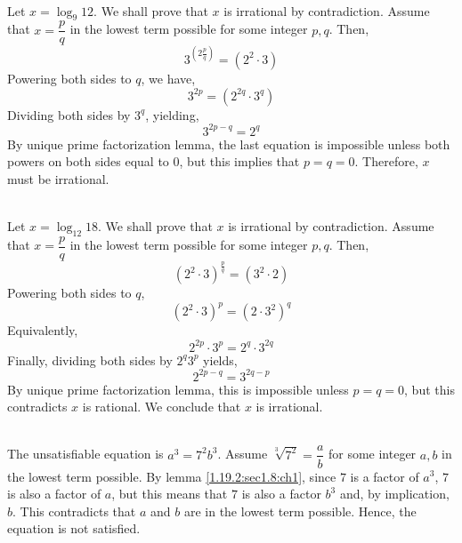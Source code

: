 \begin{pr}\leavevmode
    \\
    Let $x = \log_9 12$. We shall prove that $x$ is irrational by contradiction.
    Assume that $x = \dfrac{p}{q}$ in the lowest term possible for some integer $p,q$. Then,
    \begin{equation*}
        3^{\left(2\frac{p}{q}\right)} = (2^2 \cdot 3)
    \end{equation*}
    Powering both sides to $q$, we have,
    \begin{equation*}
        3^{2p} = (2^{2q} \cdot 3^q)
    \end{equation*}
    Dividing both sides by $3^q$, yielding,
    \begin{equation*}
        3^{2p - q} = 2^q
    \end{equation*}
    By unique prime factorization lemma, the last equation is impossible unless
    both powers on both sides equal to $0$, but this implies that $p = q = 0$. Therefore,
    $x$ must be irrational.
\end{pr}

\begin{pr}\leavevmode
    \\
    Let $x = \log_{12} 18$. We shall prove that $x$ is irrational by contradiction.
    Assume that $x = \dfrac{p}{q}$ in the lowest term possible for some integer $p,q$.
    Then,
    \begin{equation*}
        (2^2 \cdot 3)^{\frac{p}{q}} = (3^2 \cdot 2)
    \end{equation*}
    Powering both sides to $q$,
    \begin{equation*}
        (2^2 \cdot 3)^p = (2 \cdot 3^2)^q
    \end{equation*}
    Equivalently,
    \begin{equation*}
        2^{2p} \cdot 3^p = 2^q \cdot 3^{2q}
    \end{equation*}
    Finally, dividing both sides by $2^q3^p$ yields,
    \begin{equation*}
        2^{2p - q} = 3^{2q - p}
    \end{equation*}
    By unique prime factorization lemma, this is impossible unless $p = q = 0$, but
    this contradicts $x$ is rational. We conclude that $x$ is irrational.
\end{pr}

\begin{pr}\leavevmode
    \\
    The unsatisfiable equation is $a^3 = 7^2b^3$. Assume $\sqrt[3]{7^2} = \dfrac{a}{b}$
    for some integer $a,b$ in the lowest term possible. By lemma \ref{1.19.2:sec1.8:ch1},
    since $7$ is a factor of $a^3$, $7$ is also a factor of $a$, but this means
    that $7$ is also a factor $b^3$ and, by implication, $b$. This contradicts that
    $a$ and $b$ are in the lowest term possible. Hence, the equation is not satisfied.
\end{pr}

